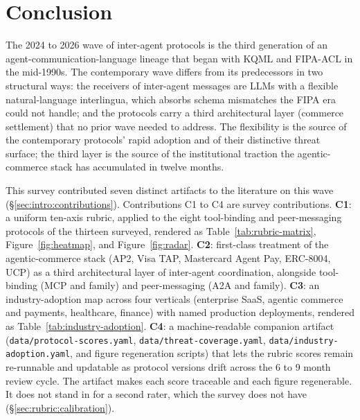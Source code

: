 \section{Conclusion}
\label{sec:conclusion}

The 2024 to 2026 wave of inter-agent protocols is the
third generation of an agent-communication-language
lineage that began with KQML and FIPA-ACL in the
mid-1990s. The contemporary wave differs from its
predecessors in two structural ways: the receivers
of inter-agent messages are LLMs with a flexible
natural-language interlingua, which absorbs schema
mismatches the FIPA era could not handle; and the
protocols carry a third architectural layer
(commerce settlement) that no prior wave needed to
address. The flexibility is the source of the
contemporary protocols' rapid adoption and of their
distinctive threat surface; the third layer is the
source of the institutional traction the
agentic-commerce stack has accumulated in twelve
months.

This survey contributed seven distinct artifacts to the
literature on this wave
(\S\ref{sec:intro:contributions}). Contributions C1 to C4
are survey contributions. \textbf{C1}: a
uniform ten-axis rubric, applied to the eight
tool-binding and peer-messaging protocols of the thirteen
surveyed, rendered as
Table~\ref{tab:rubric-matrix},
Figure~\ref{fig:heatmap}, and Figure~\ref{fig:radar}.
\textbf{C2}: first-class treatment of the
agentic-commerce stack (AP2, Visa TAP, Mastercard
Agent Pay, ERC-8004, UCP) as a third architectural layer
of inter-agent coordination, alongside tool-binding
(MCP and family) and peer-messaging (A2A and family).
\textbf{C3}: an industry-adoption map across four
verticals (enterprise SaaS, agentic commerce and
payments, healthcare, finance) with named production
deployments, rendered as
Table~\ref{tab:industry-adoption}. \textbf{C4}: a
machine-readable companion artifact
(\texttt{data/protocol-scores.yaml},
\texttt{data/threat-coverage.yaml},
\texttt{data/industry-adoption.yaml}, and figure
regeneration scripts) that lets the rubric scores
remain re-runnable and updatable as protocol
versions drift across the 6 to 9 month review cycle.
The artifact makes each score traceable and each figure
regenerable. It does not stand in for a second rater,
which the survey does not have
(\S\ref{sec:rubric:calibration}).

